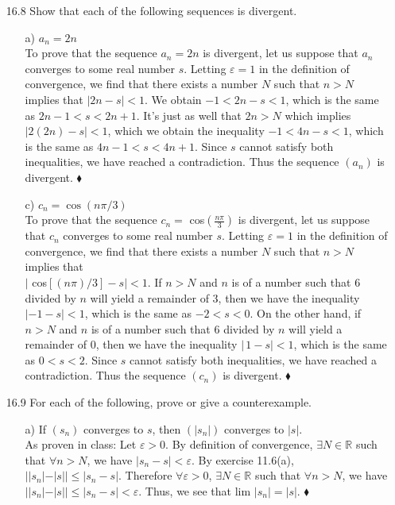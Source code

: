 \documentclass[12pt]{article}
\begin{document}
\begin{enumerate}
\begin{enumerate}
\item[16.8] Show that each of the following sequences is divergent.
\begin{enumerate}
\item[a)] $a_n = 2n$ \\
To prove that the sequence $a_n = 2n$ is divergent, let us suppose that $a_n$ converges
to some real number $s$. Letting $\varepsilon = 1$ in the definition of convergence, we find that
there exists a number $N$ such that $n > N$ implies that $|2n - s| < 1$. We obtain 
$-1 < 2n - s < 1$, which is the same as $2n - 1 < s < 2n + 1$. It's just as well that $2n > N$
which implies $|2(2n) - s| < 1$, which we obtain the inequality $-1 < 4n - s < 1$, which
is the same as $4n - 1 < s < 4n + 1$. Since $s$ cannot satisfy both inequalities, we have 
reached a contradiction. Thus the sequence $(a_n)$ is divergent. $\blacklozenge$

\item[c)] $c_n = \cos (n\pi/3)$ \\
To prove that the sequence $c_n =$ cos$\left( \frac{n\pi}{3} \right)$ 
is divergent, let us suppose that $c_n$ converges
to some real number $s$. Letting $\varepsilon = 1$ in the definition of convergence, we find that
there exists a number $N$ such that $n > N$ implies that \\
$|$ cos$[(n\pi )/3] - s| < 1$. If $n > N$ and $n$ is of a number such that $6$ divided by $n$ 
will yield a remainder of $3$, then we have the inequality $| -1 - s | < 1$, which is the same
as $-2 < s < 0$. On the other hand, if $n > N$ and $n$ is of a number such that $6$ divided
by $n$ will yield a remainder of $0$, then we have the inequality $|\, 1 - s | < 1$, which is
the same as $0 < s < 2$. Since $s$ cannot satisfy both inequalities, we have reached
a contradiction. Thus the sequence $(c_n)$ is divergent. $\blacklozenge$
\end{enumerate}

\item[16.9] For each of the following, prove or give a counterexample.
\begin{enumerate}
\item[a)] If $(s_n)$ converges to $s$, then $(|s_n|)$ converges to $|s|$.\\
As proven in class: Let $\varepsilon > 0$. By definition of convergence, 
$\exists N \in \mathbb{R}$ such that $\forall n > N$, we have $|s_n - s| < \varepsilon$.
By exercise 11.6(a), $||s_n| - |s|| \leq |s_n - s|$. Therefore $\forall \varepsilon > 0$,
$\exists N \in \mathbb{R}$ such that $\forall n > N$, we have $||s_n| - |s|| \leq |s_n - s| < 
\varepsilon$. Thus, we see that lim $|s_n| = |s|$. $\blacklozenge$


\end{enumerate}
\end{enumerate}
\end{enumerate}
\end{document}
